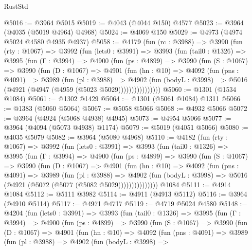\begin{lexlean}{RustStd}
\begin{coremodule}
{\begin{coremodule}
{{{{{{{{{{{{{{{{{{{{{{{{{{{{{{{{{{{{{{@5016 := @3964 @5015
@5019 := @4043 (@4044 @150) @4577
@5023 := @3964 (@4035 (@5019 @4964) @4968)
@5024 := @4069 @150
@5029 := @4973 (@4974 @5024 @4580 @4935 @4937)
@5058 := @4179
    (fun (rc : @3988) =>
    @3990
      (fun (rty : @1067) =>
      @3992
        (fun (lets0 : @3991) =>
        @3993
          (fun (tail0 : @1326) =>
          @3995
            (fun (Γ : @3994) =>
            @4900
              (fun (ps : @4899) =>
              @3990
                (fun (S : @1067) =>
                @3990
                  (fun (D : @1067) =>
                  @4901
                    (fun (hn : @10) =>
                    @4092
                      (fun (pns : @4091) =>
                      @3989
                        (fun (pl : @3988) =>
                        @4902
                          (fun (bodyL : @3998) =>
                          @5016 (@4921 (@4947 (@4959 (@5023 @5029))))))))))))))))
@5060 := @1301 (@1534 @1084)
@5061 := @1302 @1429
@5064 := @1301 (@5061 @1084) @1311
@5066 := @1383 (@5060 @5064)
@5067 := @5058 @5066
@5068 := @4932 @5066
@5072 := @3964 (@4924 (@5068 @4938) @4945)
@5073 := @4954 @5066
@5077 := @3964 (@4094 (@5073 @4938) @1174)
@5079 := @5019 (@4051 @5066)
@5080 := @4035 @5079
@5082 := @3964 (@5080 @4968)
@5110 := @4182
    (fun (rty : @1067) =>
    @3992
      (fun (lets0 : @3991) =>
      @3993
        (fun (tail0 : @1326) =>
        @3995
          (fun (Γ : @3994) =>
          @4900
            (fun (ps : @4899) =>
            @3990
              (fun (S : @1067) =>
              @3990
                (fun (D : @1067) =>
                @4901
                  (fun (hn : @10) =>
                  @4092
                    (fun (pns : @4091) =>
                    @3989
                      (fun (pl : @3988) =>
                      @4902
                        (fun (bodyL : @3998) =>
                        @5016 (@4921 (@5072 (@5077 (@5082 @5029)))))))))))))))
    @1084
@5111 := @4914 @1084
@5112 := @5111 @3982
@5114 := @4911 (@4913 @5112)
@5116 := @3964 (@4910 @5114)
@5117 := @4971 @4717
@5119 := @4719 @5024 @4580
@5148 := @4204
    (fun (lets0 : @3991) =>
    @3993
      (fun (tail0 : @1326) =>
      @3995
        (fun (Γ : @3994) =>
        @4900
          (fun (ps : @4899) =>
          @3990
            (fun (S : @1067) =>
            @3990
              (fun (D : @1067) =>
              @4901
                (fun (hn : @10) =>
                @4092
                  (fun (pns : @4091) =>
                  @3989
                    (fun (pl : @3988) =>
                    @4902
                      (fun (bodyL : @3998) =>
}}}}}}}}}}}}}}}}}}}}}}}}}}}}}}}}}}}}}}
\end{coremodule}}
\end{coremodule}
\end{lexlean}
